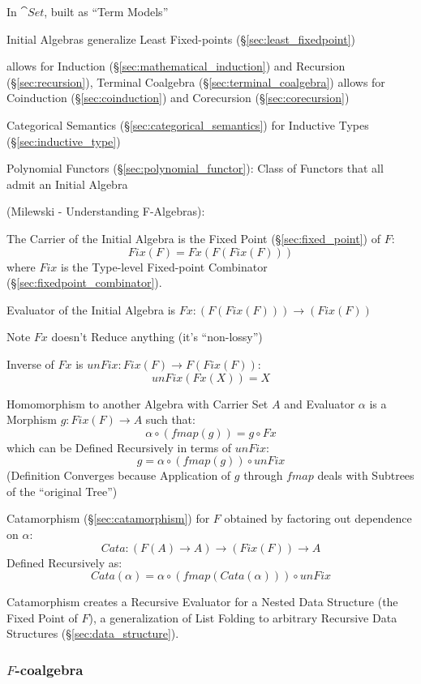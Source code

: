 In $\cat{Set}$, built as ``Term Models'' \cite{corfield08} %

Initial Algebras generalize Least Fixed-points
(\S\ref{sec:least_fixedpoint}) \cite{rutten00}

allows for Induction (\S\ref{sec:mathematical_induction}) and
Recursion (\S\ref{sec:recursion}), Terminal Coalgebra
(\S\ref{sec:terminal_coalgebra}) allows for Coinduction
(\S\ref{sec:coinduction}) and Corecursion (\S\ref{sec:corecursion})

Categorical Semantics (\S\ref{sec:categorical_semantics}) for
Inductive Types (\S\ref{sec:inductive_type})

Polynomial Functors (\S\ref{sec:polynomial_functor}): Class of Functors that all
admit an Initial Algebra %

(Milewski - Understanding F-Algebras):

The Carrier of the Initial Algebra is the Fixed Point
(\S\ref{sec:fixed_point}) of $F$:
\[
  Fix (F) = Fx (F (Fix (F)))
\]
where $Fix$ is the Type-level Fixed-point Combinator
(\S\ref{sec:fixedpoint_combinator}).

Evaluator of the Initial Algebra is $Fx : (F (Fix (F))) \rightarrow
(Fix (F))$

\fist Note $Fx$ doesn't Reduce anything (it's ``non-lossy'')

Inverse of $Fx$ is $unFix : Fix (F) \rightarrow F (Fix (F))$:
\[
  unFix (Fx (X)) = X
\]

Homomorphism to another Algebra with Carrier Set $A$ and Evaluator
$\alpha$ is a Morphism $g : Fix (F) \rightarrow A$ such that:
\[
  \alpha \circ (fmap (g)) = g \circ Fx
\]
which can be Defined Recursively in terms of $unFix$:
\[
  g = \alpha \circ (fmap (g)) \circ unFix
\]
(Definition Converges because Application of $g$ through $fmap$ deals
with Subtrees of the ``original Tree'')

Catamorphism (\S\ref{sec:catamorphism}) for $F$ obtained by factoring
out dependence on $\alpha$:
\[
  Cata : (F (A) \rightarrow A) \rightarrow (Fix (F)) \rightarrow A
\]
Defined Recursively as:
\[
  Cata (\alpha) = \alpha \circ (fmap (Cata (\alpha))) \circ unFix
\]

Catamorphism creates a Recursive Evaluator for a Nested Data Structure
(the Fixed Point of $F$), a generalization of List Folding to
arbitrary Recursive Data Structures (\S\ref{sec:data_structure}).



\subsubsection{$F$-coalgebra}\label{sec:f_coalgebra}

